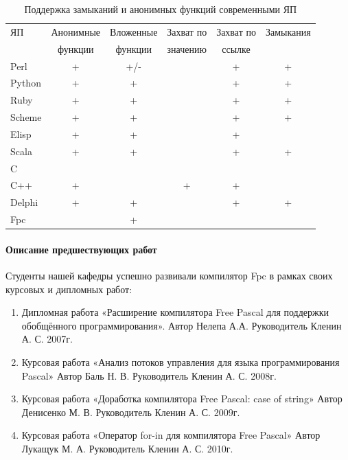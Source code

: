 \documentclass{imcs}
\begin{document}
\begin{table}[h!]
\begin{center}
\begin{tabular}{|l|c|c|c|c|c|}
\hline
  ЯП     &  Анонимные  &  Вложенные  &  Захват по  &  Захват по  &  Замыкания  \\
         &  функции    &  функции    &  значению   &  ссылке     &             \\
\hline
 Perl    &  +          &  +/-        &             &  +          &  +          \\
\hline
 Python  &  +          &  +          &             &  +          &  +          \\
\hline
 Ruby    &  +          &  +          &             &  +          &  +          \\
\hline
 Scheme  &  +          &  +          &             &  +          &  +          \\
\hline
 Elisp   &  +          &  +          &             &  +          &             \\
\hline
 Scala   &  +          &  +          &             &  +          &  +          \\

\hline
 C       &             &             &             &             &             \\
\hline
 C++     &  +          &             &  +          &  +          &             \\
\hline
 Delphi  &  +          &  +          &             &  +          &  +          \\
\hline
 Fpc     &             &  +          &             &             &             \\
\hline
\end{tabular}
\caption{Поддержка замыканий и анонимных функций современными ЯП}\label{tab:wsi_diff_rel}
\end{center}
\end{table}

\paragraph{Описание предшествующих работ}
Студенты нашей кафедры успешно развивали компилятор Fpc в рамках своих
курсовых и дипломных работ:
\begin{enumerate}
    \item Дипломная работа «Расширение компилятора Free Pascal для поддержки
обобщённого программирования». Автор Нелепа А.А. Руководитель Кленин А. С.
2007г.
    \item Курсовая работа «Анализ потоков управления для языка программирования Pascal» Автор Баль Н. В. Руководитель Кленин А. С. 2008г.
    \item Курсовая работа «Доработка компилятора Free Pascal: case of string» Автор Денисенко М. В. Руководитель Кленин А. С. 2009г.
    \item Курсовая работа «Оператор for-in для компилятора Free Pascal» Автор Лукащук М.
А. Руководитель Кленин А. С. 2010г.
\end{enumerate}
\end{document}
